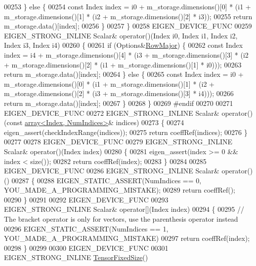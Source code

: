 \begin{DoxyCode}
00253       \} \textcolor{keywordflow}{else} \{
00254         \textcolor{keyword}{const} Index index = i0 + m\_storage.dimensions()[0] * (i1 + m\_storage.dimensions()[1] * (i2 + 
      m\_storage.dimensions()[2] * i3));
00255         \textcolor{keywordflow}{return} m\_storage.data()[index];
00256       \}
00257     \}
00258     EIGEN\_DEVICE\_FUNC
00259     EIGEN\_STRONG\_INLINE Scalar& operator()(Index i0, Index i1, Index i2, Index i3, Index i4)
00260     \{
00261       \textcolor{keywordflow}{if} (Options&\hyperlink{group__enums_ggaacded1a18ae58b0f554751f6cdf9eb13acfcde9cd8677c5f7caf6bd603666aae3}{RowMajor}) \{
00262         \textcolor{keyword}{const} Index index = i4 + m\_storage.dimensions()[4] * (i3 + m\_storage.dimensions()[3] * (i2 + 
      m\_storage.dimensions()[2] * (i1 + m\_storage.dimensions()[1] * i0)));
00263         \textcolor{keywordflow}{return} m\_storage.data()[index];
00264       \} \textcolor{keywordflow}{else} \{
00265         \textcolor{keyword}{const} Index index = i0 + m\_storage.dimensions()[0] * (i1 + m\_storage.dimensions()[1] * (i2 + 
      m\_storage.dimensions()[2] * (i3 + m\_storage.dimensions()[3] * i4)));
00266         \textcolor{keywordflow}{return} m\_storage.data()[index];
00267       \}
00268     \}
00269 \textcolor{preprocessor}{#endif}
00270 
00271     EIGEN\_DEVICE\_FUNC
00272     EIGEN\_STRONG\_INLINE Scalar& operator()(\textcolor{keyword}{const} \hyperlink{class_eigen_1_1array}{array<Index, NumIndices>}& indices)
00273     \{
00274       eigen\_assert(checkIndexRange(indices));
00275       \textcolor{keywordflow}{return} coeffRef(indices);
00276     \}
00277 
00278     EIGEN\_DEVICE\_FUNC
00279     EIGEN\_STRONG\_INLINE Scalar& operator()(Index index)
00280     \{
00281       eigen\_assert(index >= 0 && index < size());
00282       \textcolor{keywordflow}{return} coeffRef(index);
00283     \}
00284 
00285     EIGEN\_DEVICE\_FUNC
00286     EIGEN\_STRONG\_INLINE Scalar& operator()()
00287     \{
00288       EIGEN\_STATIC\_ASSERT(NumIndices == 0, YOU\_MADE\_A\_PROGRAMMING\_MISTAKE);
00289       \textcolor{keywordflow}{return} coeffRef();
00290     \}
00291 
00292     EIGEN\_DEVICE\_FUNC
00293     EIGEN\_STRONG\_INLINE Scalar& operator[](Index index)
00294     \{
00295       \textcolor{comment}{// The bracket operator is only for vectors, use the parenthesis operator instead}
00296       EIGEN\_STATIC\_ASSERT(NumIndices == 1, YOU\_MADE\_A\_PROGRAMMING\_MISTAKE)
00297       \textcolor{keywordflow}{return} coeffRef(index);
00298     \}
00299 
00300     EIGEN\_DEVICE\_FUNC
00301     EIGEN\_STRONG\_INLINE \hyperlink{class_eigen_1_1_tensor_fixed_size}{TensorFixedSize}()

\end{DoxyCode}
